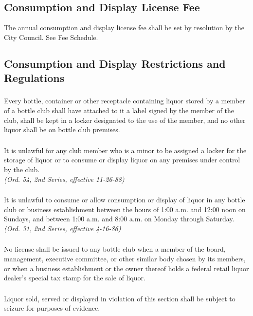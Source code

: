 \subsection{Consumption and Display License Fee}
The annual consumption and display license fee shall be set by resolution by the City Council. See Fee Schedule.
\subsection{Consumption and Display Restrictions and Regulations}
\subsubsection{}
Every bottle, container or other receptacle containing liquor stored by a member of a bottle club shall have attached to it a label signed by the member of the club, shall be kept in a locker designated to the use of the member, and no other liquor shall be on bottle club premises.
\subsubsection{}
It is unlawful for any club member who is a minor to be assigned a locker for the storage of liquor or to consume or display liquor on any premises under control by the club.\\
\emph{(Ord. 54, 2nd Series, effective 11-26-88)}
\subsubsection{}
It is unlawful to consume or allow consumption or display of liquor in any bottle club or business establishment between the hours of 1:00 a.m. and 12:00 noon on Sundays, and between 1:00 a.m. and 8:00 a.m. on Monday through Saturday.\\
\emph{(Ord. 31, 2nd Series, effective 4-16-86)}
\subsubsection{}
No license shall be issued to any bottle club when a member of the board, management, executive committee, or other similar body chosen by its members, or when a business establishment or the owner thereof holds a federal retail liquor dealer’s special tax stamp for the sale of liquor.
\subsubsection{}
Liquor sold, served or displayed in violation of this section shall be subject to seizure for purposes of evidence.
